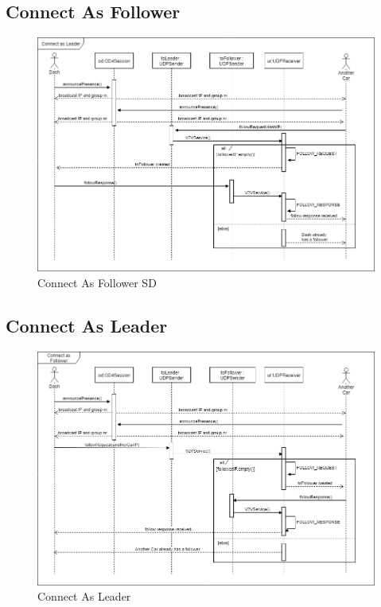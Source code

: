 \documentclass[12pt]{article}
\begin{document}
\subsection{Connect As Follower}
\begin{figure}[ht!]
\centering
\includegraphics[width=\linewidth]{Diagrams/ConnectAsFollower.png}
\caption{Connect As Follower SD}
\label{fig:connectasfollower}
\end{figure}
\pagebreak

\subsection{Connect As Leader}
\begin{figure}[ht!]
\centering
\includegraphics[width=\linewidth]{Diagrams/ConnectAsLeader.png}
\caption{Connect As Leader}
\label{fig:connectasleader}
\end{figure}
\pagebreak
\end{document}
